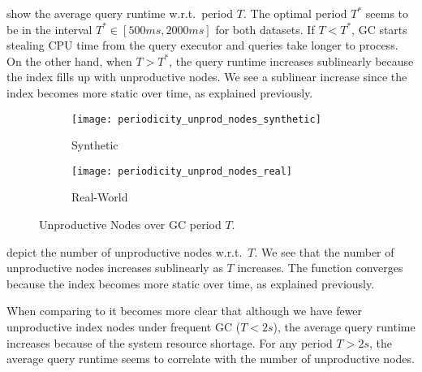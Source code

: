\documentclass[abstracton,12pt]{scrartcl}
\theoremstyle{definition}
\begin{document}
\vspace{-0.2cm}

show the average query runtime w.r.t.\ period $T$.
The optimal period $T^*$ seems to be in the interval $T^* \in [500ms,2000ms]$ for
both datasets. If $T < T^*$, GC starts stealing CPU time
from the query executor and queries take longer to process.
On the other hand, when $T > T^*$, the query runtime increases sublinearly because
the index fills up with unproductive nodes. We see a sublinear increase since
the index becomes more static over time, as explained previously.

\vspace{-0.4cm}

\begin{figure}[H]
  \centering
  \begin{subfigure}{0.49\linewidth}
    \centering
    \caption{Synthetic}
    \texttt{[image: periodicity\_unprod\_nodes\_synthetic]}
    \label{fig:periodicity_unprod_nodes_synthetic}
  \end{subfigure}
  \begin{subfigure}{0.49\linewidth}
    \centering
    \caption{Real-World}
    \texttt{[image: periodicity\_unprod\_nodes\_real]}
    \label{fig:periodicity_unprod_nodes_real}
  \end{subfigure}
  \vspace{-0.65cm}
  \caption[Unproductive Nodes over GC period $T$]{Unproductive Nodes over GC period $T$.}
\end{figure}

\vspace{-0.2cm}

depict the number of unproductive nodes w.r.t.\ $T$. We see that the
number of unproductive nodes increases sublinearly as $T$ increases.
The function converges because the index becomes more static over time, as
explained previously.

When comparing 
to
it becomes more clear that although we have fewer unproductive
index nodes under frequent GC ($T < 2s$), the average query runtime increases
because of the system resource shortage. For any period $T > 2s$, the
average query runtime seems to correlate with the number of
unproductive nodes.
\end{document}
